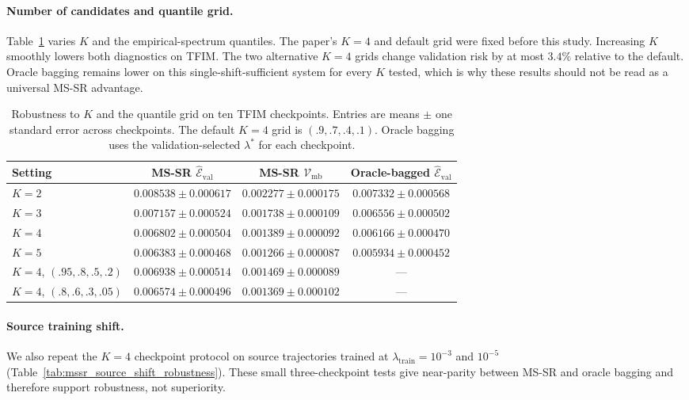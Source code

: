 \paragraph{Number of candidates and quantile grid.}
Table~\ref{tab:mssr_k_quantile_robustness} varies $K$ and the empirical-spectrum
quantiles. The paper's $K=4$ and default grid were fixed before this study.
Increasing $K$ smoothly lowers both diagnostics on TFIM. The two alternative
$K=4$ grids change validation risk by at most $3.4\%$ relative to the default.
Oracle bagging remains lower on this single-shift-sufficient system for every
$K$ tested, which is why these results should not be read as a universal MS-SR
advantage.

\begin{table}[h]
\centering
\small
\begin{tabular}{lccc}
\toprule
Setting & MS-SR $\widehat{\mathcal E}_{\mathrm{val}}$
  & MS-SR $\mathcal V_{\mathrm{mb}}$
  & Oracle-bagged $\widehat{\mathcal E}_{\mathrm{val}}$ \\
\midrule
$K=2$ & $0.008538\pm0.000617$ & $0.002277\pm0.000175$ & $0.007332\pm0.000568$ \\
$K=3$ & $0.007157\pm0.000524$ & $0.001738\pm0.000109$ & $0.006556\pm0.000502$ \\
$K=4$ & $0.006802\pm0.000504$ & $0.001389\pm0.000092$ & $0.006166\pm0.000470$ \\
$K=5$ & $0.006383\pm0.000468$ & $0.001266\pm0.000087$ & $0.005934\pm0.000452$ \\
\midrule
$K=4$, $(.95,.8,.5,.2)$ & $0.006938\pm0.000514$ & $0.001469\pm0.000089$ & --- \\
$K=4$, $(.8,.6,.3,.05)$ & $0.006574\pm0.000496$ & $0.001369\pm0.000102$ & --- \\
\bottomrule
\end{tabular}
\caption{Robustness to $K$ and the quantile grid on ten TFIM checkpoints.
Entries are means $\mathbin{\pm}$ one standard error across checkpoints. The
default $K=4$ grid is $(.9,.7,.4,.1)$. Oracle bagging uses the
validation-selected $\lambda^*$ for each checkpoint.}
\label{tab:mssr_k_quantile_robustness}
\end{table}

\paragraph{Source training shift.}
We also repeat the $K=4$ checkpoint protocol on source trajectories trained at
$\lambda_{\mathrm{train}}=10^{-3}$ and $10^{-5}$
(Table~\ref{tab:mssr_source_shift_robustness}). These small three-checkpoint
tests give near-parity between MS-SR and oracle bagging and therefore support
robustness, not superiority.

